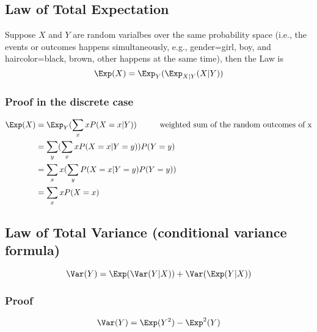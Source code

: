 
\subsection{Law of Total Expectation}
Suppose $X$ and $Y$ are random varialbes over the same probability space (i.e., the events or outcomes happens simultaneously, e.g., gender={girl, boy}, and haircolor={black, brown, other} happens at the same time), then the Law is
\begin{equation}
   \Exp(X)= \Exp_Y(\Exp_{X|Y}(X|Y))
\end{equation}
\subsubsection{Proof in the discrete case}
\begin{equation}
\begin{aligned}
   \Exp(X) & = \Exp_Y(\sum\limits_x x P(X=x|Y)) \hspace{1cm} \text{weighted sum of the random outcomes of x}\\
         & = \sum\limits_y (\sum\limits_x xP(X=x|Y=y)) P(Y=y) \\
         & = \sum\limits_x x (\sum\limits_y P(X=x|Y=y)P(Y=y)) \\
         & = \sum\limits_x x P(X=x) 
\end{aligned}
\end{equation}


\subsection{Law of Total Variance (conditional variance formula)}
\begin{equation}
   \Var(Y)= \Exp(\Var(Y|X)) + \Var(\Exp(Y|X))
\end{equation}

\subsubsection{Proof}
\begin{equation}
   \Var(Y)= \Exp(Y^2)- \Exp^2(Y)
\end{equation}


